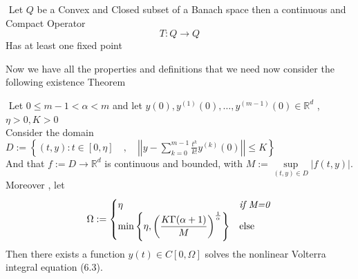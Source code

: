 \begin{theorem}
    $ $ \newline
    Let $Q$ be a Convex and Closed subset of a Banach space then a continuous
    and Compact Operator
    \[
        T:Q \to Q
    \]
    Has at least one fixed point 
\end{theorem}

Now we have all the properties and definitions that we need now consider the following existence Theorem
\newpage
\begin{theorem}
    $ $ \newline
    Let $0 \leq m-1 < \alpha < m $ and let $y(0),y^{(1)}(0),\dots,y^{(m-1)}(0) \in \mathbb{R}^d $ , $\eta>0,K>0$ 
    \\
    Consider the domain $\displaystyle D := \left\{ (t,y) : t \in [0, \eta] \quad,\quad \left|\left| y-\sum_{k=0}^{m-1} \frac{t^k}{k!} y^{(k)}(0) \right|\right| \leq K  \right\} $
    \\
    And that $f := D \to \mathbb{R}^d$ is continuous and bounded, with $M := \sup\limits_{(t,y)\in D} |f(t,y)|$. Moreover , let
    \begin{equation}
        \Omega := \begin{cases}
            \eta     & \text{\textit{if M=0}}
            \\
            \displaystyle \min\left\{\eta , \left(\frac{K\Gamma(\alpha+1)}{M}\right)^{\frac{1}{\alpha}} \right\} &\text{else}
        \end{cases}
    \end{equation}
    Then there exists a function $y(t) \in C[0, \Omega]$ solves the nonlinear Volterra integral equation (6.3).
\end{theorem}
